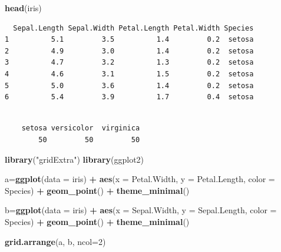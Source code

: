 \documentclass[12pt,brazil,oneside]{book}
\newenvironment{Shaded}{\begin{snugshade}}{\end{snugshade}}
\newcommand{\DataTypeTok}[1]{\textcolor[rgb]{0.13,0.29,0.53}{#1}}
\newcommand{\DecValTok}[1]{\textcolor[rgb]{0.00,0.00,0.81}{#1}}
\newcommand{\KeywordTok}[1]{\textcolor[rgb]{0.13,0.29,0.53}{\textbf{#1}}}
\newcommand{\NormalTok}[1]{#1}
\newcommand{\OperatorTok}[1]{\textcolor[rgb]{0.81,0.36,0.00}{\textbf{#1}}}
\newcommand{\StringTok}[1]{\textcolor[rgb]{0.31,0.60,0.02}{#1}}
\begin{document}
\begin{Shaded}
\begin{Highlighting}[]
\KeywordTok{head}\NormalTok{(iris)}
\end{Highlighting}
\end{Shaded}

\begin{verbatim}
  Sepal.Length Sepal.Width Petal.Length Petal.Width Species
1          5.1         3.5          1.4         0.2  setosa
2          4.9         3.0          1.4         0.2  setosa
3          4.7         3.2          1.3         0.2  setosa
4          4.6         3.1          1.5         0.2  setosa
5          5.0         3.6          1.4         0.2  setosa
6          5.4         3.9          1.7         0.4  setosa
\end{verbatim}

\begin{Shaded}
\end{Shaded}

\begin{verbatim}

    setosa versicolor  virginica 
        50         50         50 
\end{verbatim}

\begin{Shaded}
\begin{Highlighting}[]
\KeywordTok{library}\NormalTok{(}\StringTok{"gridExtra"}\NormalTok{)}
\KeywordTok{library}\NormalTok{(ggplot2)}

\NormalTok{a=}\KeywordTok{ggplot}\NormalTok{(}\DataTypeTok{data =}\NormalTok{ iris) }\OperatorTok{+}
\StringTok{  }\KeywordTok{aes}\NormalTok{(}\DataTypeTok{x =}\NormalTok{ Petal.Width, }\DataTypeTok{y =}\NormalTok{ Petal.Length, }\DataTypeTok{color =}\NormalTok{ Species) }\OperatorTok{+}
\StringTok{  }\KeywordTok{geom_point}\NormalTok{() }\OperatorTok{+}
\StringTok{  }\KeywordTok{theme_minimal}\NormalTok{()}

\NormalTok{b=}\KeywordTok{ggplot}\NormalTok{(}\DataTypeTok{data =}\NormalTok{ iris) }\OperatorTok{+}
\StringTok{  }\KeywordTok{aes}\NormalTok{(}\DataTypeTok{x =}\NormalTok{ Sepal.Width, }\DataTypeTok{y =}\NormalTok{ Sepal.Length, }\DataTypeTok{color =}\NormalTok{ Species) }\OperatorTok{+}
\StringTok{  }\KeywordTok{geom_point}\NormalTok{() }\OperatorTok{+}
\StringTok{  }\KeywordTok{theme_minimal}\NormalTok{()}

\KeywordTok{grid.arrange}\NormalTok{(a, b, }\DataTypeTok{ncol=}\DecValTok{2}\NormalTok{)}
\end{Highlighting}
\end{Shaded}
\end{document}
